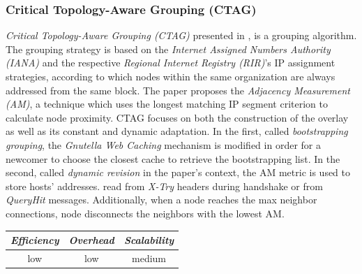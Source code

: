 \subsubsection{Critical Topology-Aware Grouping (CTAG)}
\emph{Critical Topology-Aware Grouping (CTAG)} presented in \cite{ZL2006}, is a
grouping algorithm. The grouping strategy is based on the \emph{Internet
Assigned Numbers Authority (IANA)} and the respective \emph{Regional Internet
Registry (RIR)}'s IP assignment strategies, according to which nodes within the
same organization are always addressed from the same block. The paper proposes
the \emph{Adjacency Measurement (AM)}, a technique which uses the longest
matching IP segment criterion to calculate node proximity. CTAG focuses on both
the construction of the overlay as well as its constant and dynamic adaptation.
In the first, called \emph{bootstrapping grouping}, the \emph{Gnutella Web
Caching} mechanism is modified in order for a newcomer to choose the closest
cache to retrieve the bootstrapping list. In the second, called \emph{dynamic
revision} in the paper's context, the AM metric is used to store hosts'
addresses. read from \emph{X-Try} headers during handshake or from
\emph{QueryHit} messages. Additionally, when a node reaches the max neighbor
connections, node disconnects the neighbors with the lowest AM.

\begin{center}
\begin{tabular}{ccc}
\emph{Efficiency} & \emph{Overhead} & \emph{Scalability} \\
\hline
low &
low &
medium
\end{tabular}
\end{center}



